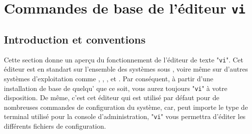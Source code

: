 %
%

\section{\texorpdfstring{\label{ann-edt-vi}Commandes de base de l'{\'e}diteur {\tt vi}}{Commandes de base de l'{\'e}diteur vi}}

\subsection{\label{ann-edt-vi-intro}Introduction et conventions}

Cette section donne un aper\c{c}u du fonctionnement de l'{\'e}diteur de
texte "{\tt vi}". Cet {\'e}diteur est en standart sur l'ensemble des
syst{\`e}mes sous {\Unix}, voire m{\^e}me sur d'autres syst{\`e}mes
d'exploitation comme {\OpenVMS}, {\DOS}, {\MacOS}, {\Windows} et
{\WindowsNT}. Par cons{\'e}quent, {\`a} partir d'une installation de
base de quelqu'{\Unix} que ce soit, vous aurez toujours "{\tt vi}"
{\`a} votre disposition. De m{\^e}me, c'est cet {\'e}diteur qui est
utilis{\'e} par d{\'e}faut pour de nombreuses commandes de configuration
du syst{\`e}me, car, peut importe le type de terminal utilis{\'e} pour
la console d'administration, "{\tt vi}" vous permettra d'{\'e}diter
les diff{\'e}rents fichiers de configuration.

